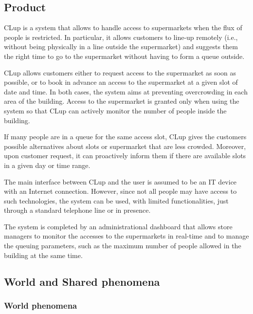\documentclass[../../main.tex]{subfiles}
\begin{document}
\subsection{Product}

CLup is a system that allows to handle access to supermarkets when the flux of
people is restricted. In particular, it allows customers to line-up remotely
(i.e., without being physically in a line outside the supermarket) and suggests
them the right time to go to the supermarket without having to form a queue
outside.

CLup allows customers either to request access to the supermarket as soon as
possible, or to book in advance an access to the supermarket at a given slot of
date and time. In both cases, the system aims at preventing overcrowding in each
area of the building. Access to the supermarket is granted only when using the
system so that CLup can actively monitor the number of people inside the
building.

If many people are in a queue for the same access slot, CLup gives the customers
possible alternatives about slots or supermarket that are less crowded.
Moreover, upon customer request, it can proactively inform them if there are
available slots in a given day or time range.

The main interface between CLup and the user is assumed to be an IT device with
an Internet connection. However, since not all people may have access to such
technologies, the system can be used, with limited functionalities, just through
a standard telephone line or in presence.

The system is completed by an administrational dashboard that allows store
managers to monitor the accesses to the supermarkets in real-time and to manage
the queuing parameters, such as the maximum number of people allowed in the
building at the same time.

\subsection{World and Shared phenomena}


\subsubsection{World phenomena}
\end{document}
